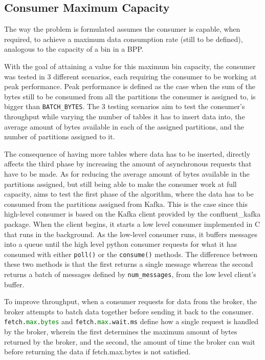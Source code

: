 \subsection{Consumer Maximum Capacity}
\label{c3subsub:consumer_maximum_capacity}

The way the problem is formulated assumes the consumer is capable, when
required, to achieve a maximum data consumption rate (still to be defined),
analogous to the capacity of a bin in a BPP.

With the goal of attaining a value for this maximum bin capacity, the consumer
was tested in 3 different scenarios, each requiring the consumer to be working
at peak performance.  Peak performance is defined as the case when the sum of
the bytes still to be consumed from all the partitions the consumer is assigned
to, is bigger than \lstinline[language=Python]{BATCH_BYTES}.  The 3 testing
scenarios aim to test the consumer's throughput while varying the number of
tables it has to insert data into, the average amount of bytes available in each
of the assigned partitions, and the number of partitions assigned to it.

The consequence of having more tables where data has to be inserted, directly
affects the third phase by increasing the amount of asynchronous requests that
have to be made.  As for reducing the average amount of bytes available in the
partitions assigned, but still being able to make the consumer work at full
capacity, aims to test the first phase of the algorithm, where the data has to
be consumed from the partitions assigned from Kafka.  This is the case since
this high-level consumer is based on the Kafka client provided by the
confluent\_kafka package. When the client begins, it starts a low level consumer
implemented in C that runs in the background. As the low-level consumer runs, it
buffers messages into a queue until the high level python consumer requests for
what it has consumed with either \lstinline[language=Python]{poll()} or the
\lstinline[language=Python]{consume()} methods. The difference between these two
methods is that the first returns a single message whereas the second returns a
batch of messages defined by \lstinline[language=Python]{num_messages}, from the
low level client's buffer. 

To improve throughput, when a consumer requests for data from the broker, the
broker attempts to batch data together before sending it back to the consumer.
\lstinline[language=Python]{fetch.max.bytes} and
\lstinline[language=Python]{fetch.max.wait.ms} define how a single request is
handled by the broker, wherein the first determines the maximum amount of bytes
returned by the broker, and the second, the amount of time the broker can wait
before returning the data if fetch.max.bytes is not satisfied.

